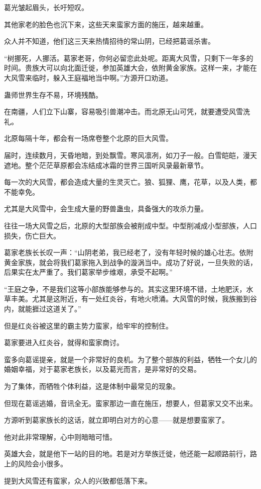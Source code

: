 \begin{this_body}
葛光皱起眉头，长吁短叹。

其他家老的脸色也沉下来，这些天来蛮家方面的施压，越来越重。

众人并不知道，他们这三天来热情招待的常山阴，已经把葛谣杀害。

“树挪死，人挪活。葛家老哥，你何必留恋此处呢。距离大风雪，只剩下一年多的时间。贵族大可以向北面迁徙，参加英雄大会，依附黄金家族。这样一来，才能在大风雪来临时，躲入王庭福地当中啊。”方源开口劝道。

蛊师世界生存不易，环境残酷。

在南疆，人们立下山寨，容易吸引兽潮冲击。而北原无山可凭，就要遭受风雪洗礼。

北原每隔十年，都会有一场席卷整个北原的巨大风雪。

届时，连续数月，天昏地暗，到处飘雪。寒风凛冽，如刀子一般。白雪皑皑，漫天遮地。整个茫茫草原都会冻结成冰霜的世界三国听风录最新章节。

每一次的大风雪，都会造成大量的生灵灭亡。狼、狐狸、鹰，花草，以及人类，都不能幸免。

尤其是大风雪中，会生成大量的野兽蛊虫，具备强大的攻杀力量。

往往一场大风雪之后，北原的大型部族会被削成中型。中型削减成小型部族，人口损失，伤亡巨大。

葛家老族长长叹一声：“山阴老弟，我已经老了，没有年轻时候的雄心壮志。依附黄金家族，就会将我们葛家拖入到战争的漩涡当中。成功了好说，一旦失败的话，后果实在太严重了。我们葛家举步维艰，承受不起啊。”

“王庭之争，不是我们这等小部族能够参与的。其实这里环境不错，土地肥沃，水草丰美。尤其是这附近，有一处红炎谷，有地火喷涌。大风雪的时候，我族搬到谷内，就能捱过这道关了。”

但是红炎谷被这里的霸主势力蛮家，给牢牢的控制住。

葛家要进入红炎谷，就得和蛮家商讨。

蛮多向葛谣提亲，就是一个非常好的良机。为了整个部族的利益，牺牲一个女儿的婚姻幸福，对于葛家老族长，以及葛光而言，是非常好的交易。

为了集体，而牺牲个体利益，这是体制中最常见的现象。

但现在葛谣逃婚，音讯全无。蛮家那边一直在施压，想要人，但葛家又交不出来。

方源听到葛家族长的这话，就立即明白对方的心意——就是想要蛮家了。

他对此非常理解，心中则暗暗可惜。

英雄大会，就是他下一站的目的地。若是对方举族迁徙，他还能一起顺路前行，路上的风险会小很多。

提到大风雪还有蛮家，众人的兴致都低落下来。


\end{this_body}
